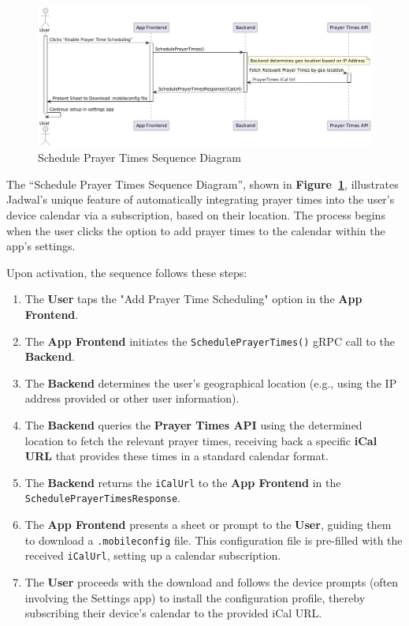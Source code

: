 \begin{figure}[!h]
  \centering
  \includegraphics[width=\textwidth]{images/docs/diagrams/sequence-diagrams/all-sequence-diagrams/Schedule Prayer Times.png}
  \caption{Schedule Prayer Times Sequence Diagram}
  \label{fig:seq/schedule-prayer-times}
\end{figure}

The ``Schedule Prayer Times Sequence Diagram'', shown in \textbf{Figure~\ref{fig:seq/schedule-prayer-times}}, illustrates Jadwal's unique feature of automatically integrating prayer times into the user's device calendar via a subscription, based on their location. The process begins when the user clicks the option to add prayer times to the calendar within the app's settings.

Upon activation, the sequence follows these steps:
\begin{enumerate}
  \item The \textbf{User} taps the "Add Prayer Time Scheduling" option in the \textbf{App Frontend}.
  \item The \textbf{App Frontend} initiates the \texttt{SchedulePrayerTimes()} gRPC call to the \textbf{Backend}.
  \item The \textbf{Backend} determines the user's geographical location (e.g., using the IP address provided or other user information).
  \item The \textbf{Backend} queries the \textbf{Prayer Times API} using the determined location to fetch the relevant prayer times, receiving back a specific \textbf{iCal URL} that provides these times in a standard calendar format.
  \item The \textbf{Backend} returns the \texttt{iCalUrl} to the \textbf{App Frontend} in the \texttt{SchedulePrayerTimesResponse}.
  \item The \textbf{App Frontend} presents a sheet or prompt to the \textbf{User}, guiding them to download a \texttt{.mobileconfig} file. This configuration file is pre-filled with the received \texttt{iCalUrl}, setting up a calendar subscription.
  \item The \textbf{User} proceeds with the download and follows the device prompts (often involving the Settings app) to install the configuration profile, thereby subscribing their device's calendar to the provided iCal URL.
\end{enumerate}

